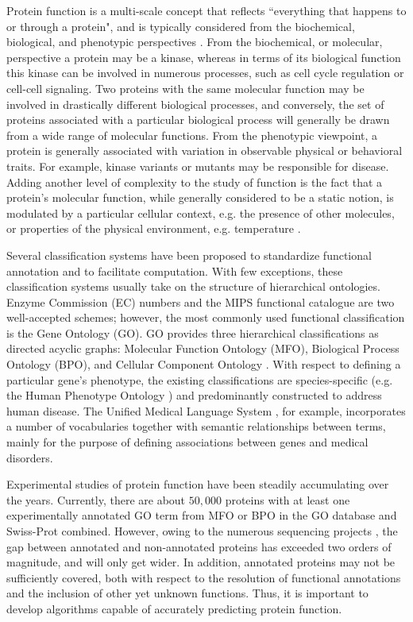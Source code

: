 
Protein function is a multi-scale concept that reflects ``everything that happens to or through a protein"\citep{Rost2003}, and is typically considered from the biochemical, biological, and phenotypic perspectives \citep{Bartlett2003}. From the biochemical, or molecular, perspective a protein may be a kinase, whereas in terms of its biological function this kinase can be involved in numerous processes, such as cell cycle regulation or cell-cell signaling. Two proteins with the same molecular function may be involved in drastically different biological processes, and conversely, the set of proteins associated with a particular biological process will generally be drawn from a wide range of molecular functions. From the phenotypic viewpoint, a protein is generally associated with variation in observable physical or behavioral traits. For example, kinase variants or mutants may be responsible for disease. Adding another level of complexity to the study of function is the fact that a protein's molecular function, while generally considered to be a static notion, is modulated by a particular cellular context, e.g. the presence of other molecules, or properties of the physical environment, e.g. temperature \citep{Mohan2009}.

Several classification systems have been proposed to standardize functional annotation and to facilitate computation. With few exceptions, these classification systems usually take on the structure of hierarchical ontologies. Enzyme Commission (EC) numbers \citep{NC_IUBMB_1992} and the MIPS functional catalogue \citep{Ruepp2004} are two well-accepted schemes; however, the most commonly used functional classification is the Gene Ontology (GO). GO provides three hierarchical classifications as directed acyclic graphs: Molecular Function Ontology (MFO), Biological Process Ontology (BPO), and Cellular Component Ontology \citep{Ashburner2000}. With respect to defining a particular gene's phenotype, the existing classifications are species-specific (e.g. the Human Phenotype Ontology \citep{Robinson2010}) and predominantly constructed to address human disease. The Unified Medical Language System \citep{Bodenreider2004}, for example, incorporates a number of vocabularies together with semantic relationships between terms, mainly for the purpose of defining associations between genes and medical disorders.

Experimental studies of protein function have been steadily accumulating over the years. Currently, there are about $50,000$ proteins with at least one experimentally annotated GO term from MFO or BPO in the GO database and Swiss-Prot \citep{Bairoch2005} combined. However, owing to the numerous sequencing projects \citep{Liolios2008}, the gap between annotated and non-annotated proteins has exceeded two orders of magnitude, and will only get wider. In addition, annotated proteins may not be sufficiently covered, both with respect to the resolution of functional annotations and the inclusion of other yet unknown functions. Thus, it is important to develop algorithms capable of accurately predicting protein function.

